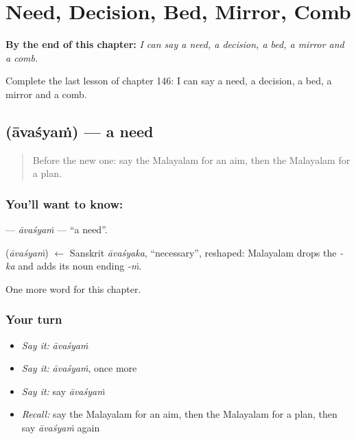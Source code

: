 
\chapter{Need, Decision, Bed, Mirror, Comb}
\label{ch:ml-need-decision-bed-mirror-comb}

\begin{chapteropening}
\textbf{By the end of this chapter:} \emph{I can say a need, a decision, a bed, a mirror and a comb.}

Complete the last lesson of chapter 146: I can say a need, a decision, a bed, a mirror and a comb.
\end{chapteropening}

\section[\texorpdfstring{\ml{ആവശ്യം} (āvaśyaṁ)}{ആവശ്യം (āvaśyaṁ)}]{ (āvaśyaṁ) — a need}

\label{lesson:ML-C146-avasyam}



\begin{quote}
Before the new one: say the Malayalam for an aim, then the Malayalam for a plan.
\end{quote}

\subsection*{You'll want to know: }
\textbf{} — \emph{āvaśyaṁ} — \textquotedblleft{}a need\textquotedblright{}.

\begin{cousinweb}
\textbf{} (\emph{āvaśyaṁ}) $\leftarrow$ Sanskrit \emph{āvaśyaka}, \textquotedblleft{}necessary\textquotedblright{}, reshaped: Malayalam drops the \emph{-ka} and adds its noun ending \emph{-ṁ}.
\end{cousinweb}

\begin{grammarlens}[title={What you've built}]
One more word for this chapter.
\end{grammarlens}

\subsection*{Your turn}
\begin{itemize}
\raggedright
  \item \emph{Say it:} \emph{āvaśyaṁ}
  \item \emph{Say it:} \emph{āvaśyaṁ}, once more
  \item \emph{Say it:} say \emph{āvaśyaṁ}
  \item \emph{Recall:} say the Malayalam for an aim, then the Malayalam for a plan, then say \emph{āvaśyaṁ} again
\end{itemize}

